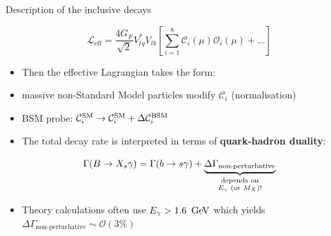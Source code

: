 \documentclass[xcolor=dvipsnames]{beamer}
\begin{document}
\begin{frame}{Description of the inclusive \BtoXsgamma decays}
   \scriptsize


      \begin{equation}\nonumber
         \mathcal{L}_{\mathrm{eff}} = \frac{4G_F}{\sqrt{2}}V_{tq}^*V_{tb}\left[\sum^{8}_{i=1}\mathcal{C}_i(\mu)\mathcal{O}_i(\mu)+ ...\right]
      \end{equation}
   
   \begin{itemize}
      \item[\ra] Then the effective Lagrangian takes the form:
   \end{itemize}
   
   \vspace{-0pt}
   
   
   
   \begin{itemize}
      \item[\ra] massive non-Standard Model particles modify $\mathcal{C}_i$ (normalisation)
      \item[\ra] BSM probe: $      \mathcal{C}_i^{\mathrm{SM}} \rightarrow \mathcal{C}_i^{\mathrm{SM}} + \Delta\mathcal{C}_i^{\mathrm{BSM}}$
      \item The total decay rate is interpreted in terms of \textbf{quark-hadron duality}:
   \end{itemize}
   
   \vspace{-10pt}
   
   \begin{equation}\nonumber
      \Gamma(B\ra\X_s\g) = \Gamma(b\ra s\g) + \underbrace{\Delta\Gamma_{\text{non-perturbative}}}_{\substack{\text{depends on}\\ \text{\Egamma (or }M_X\text{)!}}}
  \end{equation}

  \begin{itemize}
   \item Theory calculations often use ${E_{\gamma}} > 1.6~\mathrm{\,Ge\kern -0.1em V}$  which yields $\Delta\Gamma_{\text{non-perturbative}} \sim \mathcal{O}(3\%)$
  \end{itemize}
  
\end{frame}

\addtocounter{framenumber}{-1}
\end{document}
